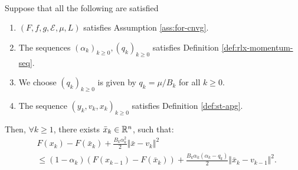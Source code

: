 \documentclass[12pt]{article}
\begin{document}
        \begin{lemma}\;\label{lemma:cnvg-prep-part3}\\
            Suppose that all the following are satisfied
            \begin{enumerate}[nosep]
                \item $(F, f, g, \mathcal E, \mu, L)$ satisfies Assumption \ref{ass:for-cnvg}. 
                \item The sequences $(\alpha_k)_{k \ge 0}, (q_k)_{k \ge 0}$ satisfies Definition \ref{def:rlx-momentum-seq}. 
                \item We choose $(q_k)_{k \ge 0}$ is given by $q_k = \mu/B_k$ for all $k \ge 0$. 
                \item The sequence $(y_k, v_k, x_k)_{k \ge 0}$ satisfies Definition \ref{def:st-apg}. 
            \end{enumerate}
            Then, $\forall k \ge 1$, there exists $\bar x_k \in \mathbb R^n$, such that: 
            \begin{align*}
                & F(x_k) - F(\bar x_k)
                + \frac{B_k\alpha_k^2}{2}\Vert \bar x - v_k\Vert^2 
                \\
                &\le 
                (1 - \alpha_k)(F(x_{k - 1}) - F(\bar x_k))
                + \frac{B_k\alpha_k(\alpha_k - q_k)}{2}\Vert \bar x_k - v_{k - 1}\Vert^2. 
            \end{align*}
        \end{lemma}
\end{document}
